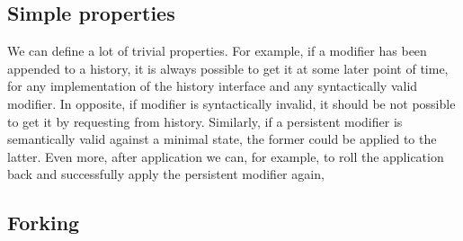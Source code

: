 \subsection{Simple properties}

We can define a lot of trivial properties. For example, if a modifier has been appended to a history, it is always possible to get it at some later point of time, for any implementation of the history interface and any syntactically valid modifier. In opposite, if modifier is syntactically invalid, it should be not possible to get it by requesting from history. Similarly, if a persistent modifier is semantically valid against a minimal state, the former could be applied to the latter. Even more, after application we can, for example, to roll the application back and successfully apply the persistent modifier again, 

\subsection{Forking}




